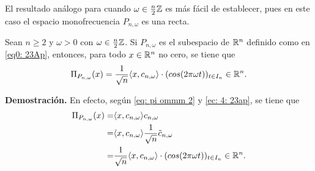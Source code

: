 El resultado análogo para cuando $\omega \in \frac{n}{2}\mathbb{Z}$
es más fácil de establecer, pues en este caso
el espacio monofrecuencia $P_{n, \omega}$ es una recta.

\begin{teo}
\label{teo: amelie2}
Sean $n \geq 2$ y $\omega > 0$ con $\omega \in \frac{n}{2}\mathbb{Z}$.
Si $P_{n, \omega}$ es el subespacio de $\mathbb{R}^{n}$ definido como 
en \eqref{eq0: 23Ap}, entonces, para todo 
$x \in \mathbb{R}^{n}$ no cero, se tiene que
\begin{equation}
\label{ec: desfase explicito 2}
\Pi_{P_{n, \omega}} (x) = 
\frac{1}{\sqrt{n}} \langle x, c_{n, \omega} \rangle
\cdot (cos (2 \pi \omega t))_{t \in I_{n}} \in \mathbb{R}^{n}.
\end{equation}
\end{teo}
\noindent
\textbf{Demostración.}
En efecto, según \eqref{eq: pi ommm 2} y 
\eqref{ec: 4: 23ap},
se tiene que
\begin{align*}
\Pi_{P_{n, \omega}} (x) = & 
\langle x, c_{n, \omega} \rangle c_{n, \omega} \\
= & \langle x, c_{n, \omega} \rangle \frac{1}{\sqrt{n}} \tilde{c}_{n, \omega} \\
= & \frac{1}{\sqrt{n}} \langle x, c_{n, \omega} \rangle
\cdot (cos (2 \pi \omega t))_{t \in I_{n}} \in \mathbb{R}^{n}.
\end{align*}

\QEDB
\vspace{0.2cm}


